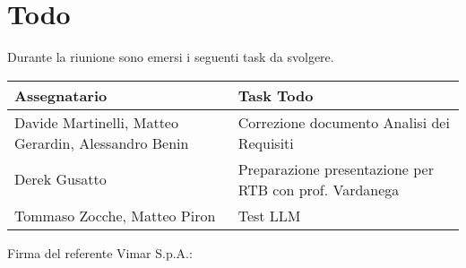 \section{Todo}
Durante la riunione sono emersi i seguenti task da svolgere.

\begin{center}
  \begin{tabular}{|p{5cm}|p{8cm}|}
    \hline
    \textbf{Assegnatario}       & \textbf{Task Todo} \\ \hline
        Davide Martinelli, Matteo Gerardin, Alessandro Benin & Correzione documento Analisi dei Requisiti \\ \hline
        Derek Gusatto & Preparazione presentazione per RTB con prof. Vardanega \\ \hline
        Tommaso Zocche, Matteo Piron & Test LLM\\ \hline
        
  \end{tabular}
\end{center}

\vspace{4cm}
\noindent Firma del referente Vimar S.p.A.: \underline{\hspace{5cm}}